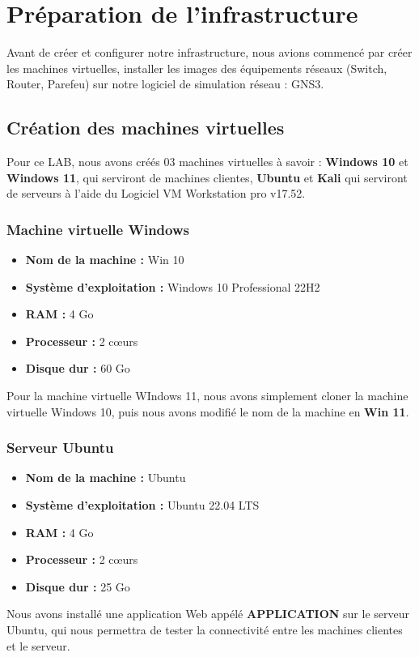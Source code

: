 \documentclass[12pt, a4paper]{article}
\begin{document}
\section{Préparation de l'infrastructure}
Avant de créer et configurer notre infrastructure, nous avions commencé par
créer les machines virtuelles, installer les images des équipements réseaux
(Switch, Router, Parefeu) sur notre logiciel de simulation réseau : GNS3.
\subsection{Création des machines virtuelles}
Pour ce LAB, nous avons créés 03 machines virtuelles à savoir : \textbf{Windows
	10} et \textbf{Windows 11}, qui serviront de machines clientes, \textbf{Ubuntu}
et \textbf{Kali} qui serviront de serveurs à l'aide du Logiciel VM Workstation
pro v17.52.
\subsubsection{Machine virtuelle Windows}
\begin{itemize}
	\item \textbf{Nom de la machine :} Win 10
	\item \textbf{Système d'exploitation :} Windows 10 Professional 22H2
	\item \textbf{RAM :} 4 Go
	\item \textbf{Processeur :} 2 cœurs
	\item \textbf{Disque dur :} 60 Go
\end{itemize}
Pour la machine virtuelle WIndows 11, nous avons simplement cloner la machine virtuelle Windows 10, puis nous avons modifié le nom de la machine en \textbf{Win 11}.
\subsubsection{Serveur Ubuntu}
\begin{itemize}
	\item \textbf{Nom de la machine :} Ubuntu
	\item \textbf{Système d'exploitation :} Ubuntu 22.04 LTS
	\item \textbf{RAM :} 4 Go
	\item \textbf{Processeur :} 2 cœurs
	\item \textbf{Disque dur :} 25 Go
\end{itemize}
Nous avons installé une application Web appélé \textbf{APPLICATION} sur le serveur Ubuntu, qui nous permettra de tester la connectivité entre les machines clientes et le serveur.
\end{document}
